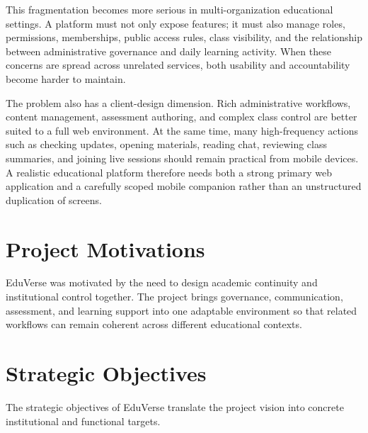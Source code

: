 This fragmentation becomes more serious in multi-organization educational
settings. A platform must not only expose features; it must also manage roles,
permissions, memberships, public access rules, class visibility, and the
relationship between administrative governance and daily learning activity.
When these concerns are spread across unrelated services, both usability and
accountability become harder to maintain.

The problem also has a client-design dimension. Rich administrative workflows,
content management, assessment authoring, and complex class control are better
suited to a full web environment. At the same time, many high-frequency actions
such as checking updates, opening materials, reading chat, reviewing class
summaries, and joining live sessions should remain practical from mobile
devices. A realistic educational platform therefore needs both a strong primary
web application and a carefully scoped mobile companion rather than an
unstructured duplication of screens.

\section{Project Motivations}\label{sec:project_motivations}

EduVerse was motivated by the need to design academic continuity and
institutional control together. The project brings governance, communication,
assessment, and learning support into one adaptable environment so that related
workflows can remain coherent across different educational contexts.

\section{Strategic Objectives}\label{sec:strategic_objectives}

The strategic objectives of EduVerse translate the project vision into concrete
institutional and functional targets.

